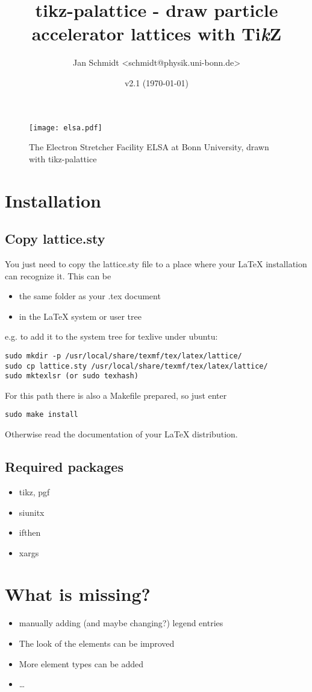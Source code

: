 \documentclass[colorlinks]{scrartcl}
\author{Jan Schmidt <schmidt@physik.uni-bonn.de>}
\date{v2.1 (\today)}
\title{tikz-palattice - draw particle accelerator lattices with Ti\textit{k}Z}
\begin{document}
\maketitle
\begin{figure}[h]
  \centering
  \texttt{[image: elsa.pdf]}
  \caption{The Electron Stretcher Facility ELSA at Bonn University, drawn with
    tikz-palattice}
\end{figure}

\clearpage
\tableofcontents
\clearpage


\section{Installation}
\label{sec-1}
\subsection{Copy lattice.sty}
\label{sec-1-1}
You just need to copy the lattice.sty file to a place where your \LaTeX{} installation can recognize it.
This can be
\begin{itemize}
\item the same folder as your .tex document
\item in the \LaTeX{} system or user tree
\end{itemize}
e.g. to add it to the system tree for texlive under ubuntu:
\begin{verbatim}
sudo mkdir -p /usr/local/share/texmf/tex/latex/lattice/
sudo cp lattice.sty /usr/local/share/texmf/tex/latex/lattice/
sudo mktexlsr (or sudo texhash)
\end{verbatim}
For this path there is also a Makefile prepared, so just enter
\begin{verbatim}
sudo make install
\end{verbatim}
Otherwise read the documentation of your \LaTeX{} distribution.
\subsection{Required packages}
\label{sec-1-2}
\begin{itemize}
\item tikz, pgf
\item siunitx
\item ifthen
\item xargs
\end{itemize}
\section{What is missing?}
\label{sec-2}
\begin{itemize}
\item manually adding (and maybe changing?) legend entries
\item The look of the elements can be improved
\item More element types can be added
\item \ldots{}
\end{itemize}
\end{document}

